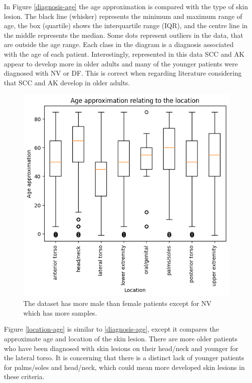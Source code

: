 In Figure \ref{diagnosis-age} the age approximation is compared with the type of skin lesion. The black line (whisker) represents the minimum and maximum range of age, the box (quartile) shows the interquartile range (IQR), and the centre line in the middle represents the median. Some dots represent outliers in the data, that are outside the age range. Each class in the diagram is a diagnosis associated with the age of each patient. Interestingly, represented in this data SCC and AK appear to develop more in older adults and many of the younger patients were diagnosed with NV or DF. This is correct when regarding literature considering that SCC and AK develop in older adults\cite{}.

\begin{figure}
	\centering
	\includegraphics[scale=0.8]{images/ISIC/location-age.png}
	\caption{The dataset has more male than female patients except for NV which has more samples.} 
\end{figure} \label{location-age}

Figure \ref{location-age} is similar to \ref{diagnosis-age}, except it compares the approximate age and location of the skin lesion. There are more older patients who have been diagnosed with skin lesions on their head/neck and younger for the lateral torso. It is concerning that there is a distinct lack of younger patients for palms/soles and head/neck, which could mean more developed skin lesions in these criteria.

